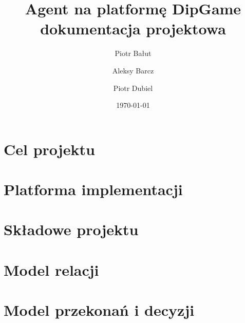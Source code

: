 \documentclass[11pt,a4paper]{report}
\date {\today}
\author {
	Piotr Bałut
	\and
	Aleksy Barcz
	\and
	Piotr Dubiel}
\title{Agent na platformę DipGame\\dokumentacja projektowa}
\begin{document}
\maketitle
\tableofcontents



\chapter{Cel projektu}


\chapter{Platforma implementacji}


\chapter{Składowe projektu}


\chapter{Model relacji}


\chapter{Model przekonań i decyzji}


\nocite{*}

\end{document}
